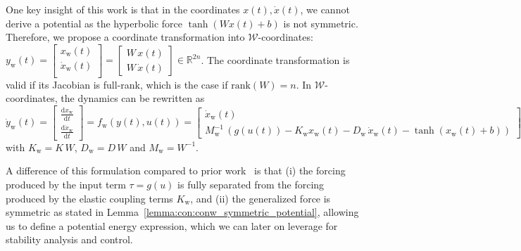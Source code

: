 One key insight of this work is that in the coordinates $x(t), \dot{x}(t)$, we cannot derive a potential 
as the hyperbolic force $\tanh(W x(t) + b)$ is not symmetric. Therefore, we propose a coordinate transformation into $\mathcal{W}$-coordinates: $y_\mathrm{w}(t) = \begin{bmatrix}
    x_\mathrm{w}(t)\\
    \dot{x}_\mathrm{w}(t)\\
\end{bmatrix} = \begin{bmatrix}
    W \, x(t)\\
    W \, \dot{x}(t)
\end{bmatrix} \in \mathbb{R}^{2n}$. The coordinate transformation is valid if its Jacobian is full-rank, which is the case if $\mathrm{rank}(W) = n$.
In $\mathcal{W}$-coordinates, the dynamics can be rewritten as
\begin{equation}\label{eq:con:conw_dynamics}
    \dot{y}_\mathrm{w}(t) = \begin{bmatrix}
        \frac{\mathrm{d}x_\mathrm{w}}{\mathrm{d}t}\\
        \frac{\mathrm{d}\dot{x}_\mathrm{w}}{\mathrm{d}t}
    \end{bmatrix} = f_\mathrm{w}(y(t), u(t)) = \begin{bmatrix}
        \dot{x}_\mathrm{w}(t)\\
        M_\mathrm{w}^{-1} \, \left (g(u(t)) -K_\mathrm{w} x_\mathrm{w}(t) - D_\mathrm{w} \, \dot{x}_\mathrm{w}(t) - \tanh(x_\mathrm{w}(t) + b) \right )
    \end{bmatrix}
\end{equation}
with $K_\mathrm{w} = K \, W$, $D_\mathrm{w} = D \, W$ and $M_\mathrm{w} = W^{-1}$. 

A difference of this formulation compared to prior work~\cite{rusch2020coupled, rusch2021unicornn, ceni2024random, lanthaler2024neural} is that (i) the forcing produced by the input term $\tau = g(u)$ is fully separated from the forcing produced by the elastic coupling terms $K_\mathrm{w}$, and (ii) the generalized force is symmetric as stated in Lemma~\ref{lemma:con:conw_symmetric_potential}, allowing us to define a potential energy expression, which we can later on leverage for stability analysis and control.

